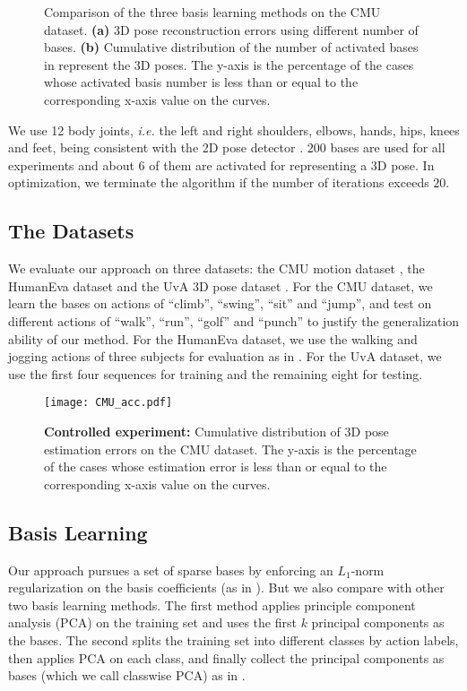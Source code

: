 \documentclass[10pt,twocolumn,letterpaper]{article}
\begin{document}
\begin{figure}
\centering \caption{Comparison of the three basis learning methods
on the CMU dataset. \textbf{(a)} 3D pose reconstruction errors
using different number of bases. \textbf{(b)} Cumulative distribution of the number of activated bases in represent the 3D poses. The y-axis is the percentage of the cases whose activated basis number is less than or equal to the corresponding x-axis value on the curves.}
\label{fig:basis}
\end{figure}


We use 12 body joints, {\em i.e.} the left and right shoulders, elbows,
hands, hips, knees and feet, being consistent with the 2D
pose detector \cite{Yang2D}. $200$ bases are used for all
experiments and about $6$ of them are activated for representing a 3D pose. In optimization, we terminate the
algorithm if the number of iterations exceeds $20$.

\subsection{The Datasets}
We evaluate our approach on three datasets: the CMU motion dataset
\cite{c10}, the HumanEva dataset \cite{sigal2006humaneva} and the
UvA 3D pose dataset \cite{c28}. For the CMU dataset, we learn the bases on actions of
``climb'', ``swing'', ``sit'' and ``jump'', and test on different
actions of ``walk'', ``run'', ``golf'' and ``punch'' to justify
the generalization ability of our method. For the HumanEva
dataset, we use the walking and jogging actions of three subjects
for evaluation as in \cite{SimoSerraCVPR2012}. For the UvA dataset, we use the first four sequences for
training and the remaining eight for testing.

\begin{figure}
\centering
\texttt{[image: CMU\_acc.pdf]}
\caption{\textbf{Controlled experiment:} Cumulative distribution
of 3D pose estimation errors on the CMU dataset. The y-axis is the percentage of the cases whose estimation error is less than or equal to the corresponding x-axis value on the curves.} \vspace{-1em} \label{fig:CMU_UVA}
\end{figure}

\subsection{Basis Learning}
\label{sec:basislearning} Our approach pursues a set of sparse
bases by enforcing an $L_1$-norm regularization on the basis
coefficients (as in \cite{MairalSparse}). But we also compare with
other two basis learning methods. The first method applies principle component analysis (PCA) on the training set and uses the first $k$ principal components as the bases. The second splits the training set into
different classes by action labels, then applies PCA on each class,
and finally collect the principal components as bases (which we
call classwise PCA) as in \cite{Ramakrishna}.
\end{document}
